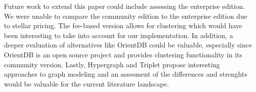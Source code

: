Future work to extend this paper could include assessing the enterprise edition. We were unable to compare the community edition to the enterprise edition due to stellar pricing. The fee-based version allows for clustering which would have been interesting to take into account for our implementation. In addition, a deeper evaluation of alternatives like OrientDB could be valuable, especially since OrientDB is an open source project and provides clustering functionality in its community version. Lastly, Hypergraph and Triplet propose interesting approaches to graph modeling and an assesment of the differences and strenghts would be valuable for the current literature landscape.

